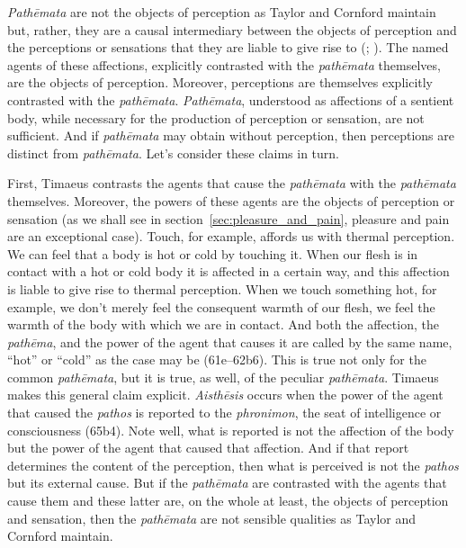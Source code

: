\emph{Pathēmata} are not the objects of perception as Taylor and Cornford maintain but, rather, they are a causal intermediary between the objects of perception and the perceptions or sensations that they are liable to give rise to (\citealt[138]{OBrien:1984ji}; \citealt{Brisson:1997qr}). The named agents of these affections, explicitly contrasted with the \emph{pathēmata} themselves, are the objects of perception. Moreover, perceptions are themselves explicitly contrasted with the \emph{pathēmata}. \emph{Pathēmata}, understood as affections of a sentient body, while necessary for the production of perception or sensation, are not sufficient. And if \emph{pathēmata} may obtain without perception, then perceptions are distinct from \emph{pathēmata}. Let's consider these claims in turn.

First, Timaeus contrasts the agents that cause the \emph{pathēmata} with the \emph{pathēmata} themselves. Moreover, the powers of these agents are the objects of perception or sensation (as we shall see in section~\ref{sec:pleasure_and_pain}, pleasure and pain are an exceptional case). Touch, for example, affords us with thermal perception. We can feel that a body is hot or cold by touching it. When our flesh is in contact with a hot or cold body it is affected in a certain way, and this affection is liable to give rise to thermal perception. When we touch something hot, for example, we don't merely feel the consequent warmth of our flesh, we feel the warmth of the body with which we are in contact. And both the affection, the \emph{pathēma}, and the power of the agent that causes it are called by the same name, ``hot'' or ``cold'' as the case may be (61e--62b6). This is true not only for the common \emph{pathēmata}, but it is true, as well, of the peculiar \emph{pathēmata}. Timaeus makes this general claim explicit. \emph{Aisthēsis} occurs when the power of the agent that caused the \emph{pathos} is reported to the \emph{phronimon}, the seat of intelligence or consciousness (65b4). Note well, what is reported is not the affection of the body but the power of the agent that caused that affection. And if that report determines the content of the perception, then what is perceived is not the \emph{pathos} but its external cause. But if the \emph{pathēmata} are contrasted with the agents that cause them and these latter are, on the whole at least, the objects of perception and sensation, then the \emph{pathēmata} are not sensible qualities as Taylor and Cornford maintain.


